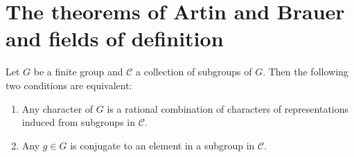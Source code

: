\documentclass[11pt, english]{article}
\begin{document}
\newpage
\section{The theorems of Artin and Brauer and fields of definition}

\begin{thm}[Artin]

Let $G$ be a finite group and $\mathscr C$ a collection of subgroups of $G$. Then the following two conditions are equivalent:
\begin{enumerate}
\item Any character of $G$ is a rational combination of characters of representations induced from subgroups in $\mathscr C$.
\item Any $g \in G$ is conjugate to an element in a subgroup in $\mathscr C$.
\end{enumerate}
\end{thm}
\end{document}
